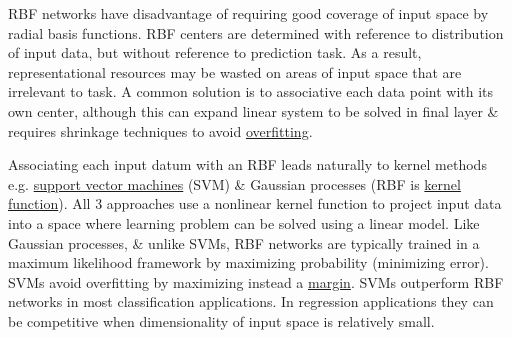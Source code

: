 \documentclass{article}
\begin{document}
RBF networks have disadvantage of requiring good coverage of input space by radial basis functions. RBF centers are determined with reference to distribution of input data, but without reference to prediction task. As a result, representational resources may be wasted on areas of input space that are irrelevant to task. A common solution is to associative each data point with its own center, although this can expand linear system to be solved in final layer \& requires shrinkage techniques to avoid \href{https://en.wikipedia.org/wiki/Overfitting}{overfitting}.

Associating each input datum with an RBF leads naturally to kernel methods e.g. \href{https://en.wikipedia.org/wiki/Support_vector_machine}{support vector machines} (SVM) \& Gaussian processes (RBF is \href{https://en.wikipedia.org/wiki/Kernel_function}{kernel function}). All 3 approaches use a nonlinear kernel function to project input data into a space where learning problem can be solved using a linear model. Like Gaussian processes, \& unlike SVMs, RBF networks are typically trained in a maximum likelihood framework by maximizing probability (minimizing error). SVMs avoid overfitting by maximizing instead a \href{https://en.wikipedia.org/wiki/Margin_(machine_learning)}{margin}. SVMs outperform RBF networks in most classification applications. In regression applications they can be competitive when dimensionality of input space is relatively small.
\end{document}
